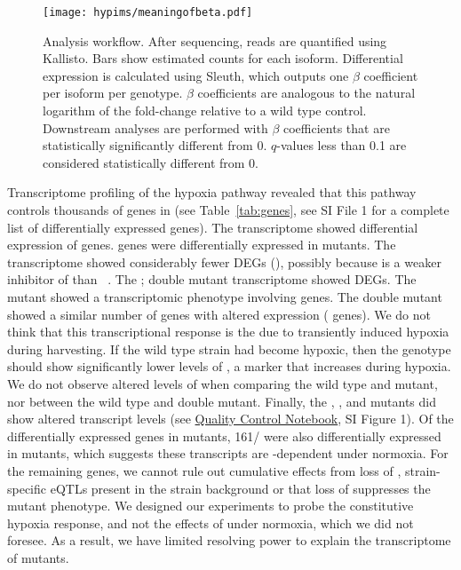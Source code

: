 \begin{figure}[tbhp]
  \centering
  \texttt{[image: hypims/meaningofbeta.pdf]}
  \caption{
    Analysis workflow. After sequencing, reads are quantified using Kallisto.
    Bars show estimated counts for each isoform. Differential expression is
    calculated using Sleuth, which outputs one $\beta$ coefficient per isoform
    per genotype. $\beta$ coefficients are analogous to the natural logarithm of
    the fold-change relative to a wild type control. Downstream analyses are
    performed with $\beta$ coefficients that are statistically significantly
    different from 0. $q$-values less than 0.1 are considered statistically
    different from 0.
  }
\label{fig:explain}
\end{figure}

Transcriptome profiling of the hypoxia pathway revealed that this pathway
controls thousands of genes in \cel{} (see Table~\ref{tab:genes}, see
SI File 1 for a complete list of differentially expressed genes).
The \egl{}
transcriptome showed differential expression of \egln{} genes. \rhyn{} genes
were differentially expressed in \rhy{} mutants. The \vhl{} transcriptome showed
considerably fewer DEGs (\vhln{}), possibly because  is a weaker
inhibitor of  than ~\citep{Shao2009}. The \egl{};\vhl{}
double mutant transcriptome showed \eglvhln{} DEGs. The \hif{} mutant showed a
transcriptomic phenotype involving \hifn{} genes. The \eglhif{} double mutant
showed a similar number of genes with altered expression (\eglhifn{} genes).
We do not think that this transcriptional response is the due to transiently
induced hypoxia during harvesting. If the wild type strain had become hypoxic,
then the \hif{} genotype should show significantly lower levels of
, a marker that increases during hypoxia. We do not observe altered
levels of  when comparing the wild type and \hif{} mutant, nor
between the wild type and \eglhif{} double mutant. Finally, the \egl{}, \vhl{},
\rhy{} and \eglvhl{} mutants did show altered  transcript levels
(see
\href{https://wormlabcaltech.github.io/mprsq/analysis_notebooks/5_quality_check.html}{
Quality Control Notebook}, SI Figure 1). Of the differentially expressed genes
in \hif{} mutants, 161/\hifn{} were also differentially expressed in \eglhif{}
mutants, which suggests these transcripts are -dependent under
normoxia. For the remaining genes, we cannot rule out cumulative effects from
loss of , strain-specific eQTLs present in the strain background or
that loss of  suppresses the mutant phenotype. We designed our
experiments to probe the constitutive hypoxia response, and not the effects of
 under normoxia, which we did not foresee. As a result, we have
limited resolving power to explain the transcriptome of \hif{} mutants.

